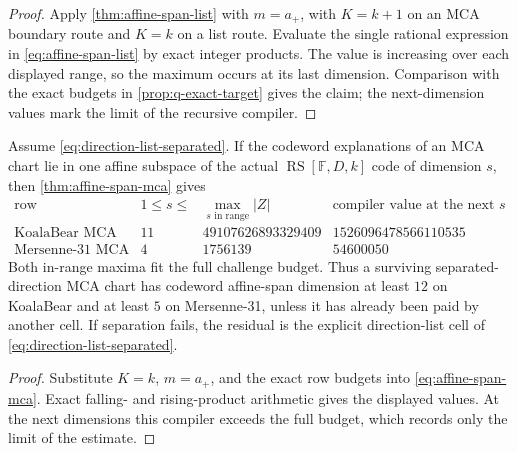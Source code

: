 \documentclass[11pt,a4paper]{amsart}
\numberwithin{equation}{section}
\theoremstyle{remark}
\DeclareMathOperator{\RS}{RS}\DeclareMathOperator{\MCA}{MCA}\DeclareMathOperator{\CA}{CA}
\newcommand{\F}{\mathbb F}\newcommand{\B}{\mathbb B}\newcommand{\K}{\mathbb K}\newcommand{\Z}{\mathbb Z}
\begin{document}
\begin{proof}
Apply \cref{thm:affine-span-list} with \(m=a_+\), with \(K=k+1\) on an
MCA boundary route and \(K=k\) on a list route.  Evaluate the single
rational expression in \eqref{eq:affine-span-list} by exact integer
products.  The value is increasing over each displayed range, so the
maximum occurs at its last dimension.  Comparison with the exact budgets
in \cref{prop:q-exact-target} gives the claim; the next-dimension values
mark the limit of the recursive compiler.
\end{proof}

\begin{proposition}
\label{prop:active-affine-span-mca}
Assume \eqref{eq:direction-list-separated}.  If the codeword explanations
of an MCA chart lie in one affine subspace of the actual
\(\RS[\F,D,k]\) code of dimension \(s\), then
\cref{thm:affine-span-mca} gives
\[
\begin{array}{c|r|r|r}
\text{row}&1\le s\le&
 \max\limits_{s\text{ in range}}|Z|&
 \text{compiler value at the next }s\\ \hline
\text{KoalaBear MCA}&11&49107626893329409&1526096478566110535\\
\text{Mersenne-31 MCA}&4&1756139&54600050
\end{array}
\tag{AF-MCA}\label{eq:active-affine-span-mca}
\]
Both in-range maxima fit the full challenge budget.  Thus a surviving
separated-direction MCA chart has codeword affine-span dimension at least
\(12\) on KoalaBear and at least \(5\) on Mersenne-31, unless it has
already been paid by another cell.  If separation fails, the residual is
the explicit direction-list cell of \eqref{eq:direction-list-separated}.
\end{proposition}

\begin{proof}
Substitute \(K=k\), \(m=a_+\), and the exact row budgets into
\eqref{eq:affine-span-mca}.  Exact falling- and rising-product arithmetic
gives the displayed values.  At the next dimensions this compiler exceeds
the full budget, which records only the limit of the estimate.
\end{proof}
\end{document}

